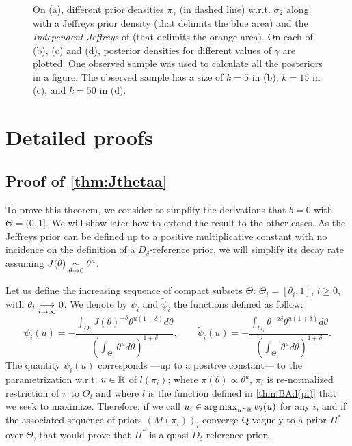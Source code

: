 \begin{figure}[h]
    \caption{On (a), different prior densities $\pi_\gamma$ (in dashed line) w.r.t. $\sigma_2$ along with a Jeffreys prior density (that delimits the blue area) and the \emph{Independent Jeffreys} of \cite{rubio_inference_2014} (that delimits the orange area). On each of (b), (c) and (d), posterior densities for different values of $\gamma$ are plotted. %
    One observed sample was used to calculate all the posteriors in a figure.
    The observed sample has a size of $k=5$ in (b), $k=15$ in (c), and $k=50$ in (d).\label{fig:priorpost}}
\end{figure}








\section{Detailed proofs}\label{sec:BA:proofs}


\subsection{Proof of \cref{thm:Jthetaa}}

To prove this theorem, we consider to simplify the derivations that $b=0$ with $\Theta=(0,1]$. We will show later how to extend the result to the other cases. As the Jeffreys prior can be defined up to a positive multiplicative constant with no incidence on the definition of a $D_\delta$-reference prior, 
we will simplify its decay rate assuming $J(\theta)\underset{\theta\rightarrow 0}{\sim}\theta^a$.

Let us define the increasing sequence of compact subsets $\Theta$: $\Theta_i=[\theta_i,1]$, $i\geq0$, with $\theta_i\overset{\ }{\underset{i\rightarrow\infty}{\longrightarrow}}0$. We denote by $\psi_i$ and $\tilde\psi_i$ the functions defined as follow:
    \begin{equation}
        \psi_i(u) = -\frac{\int_{\Theta_i}J(\theta)^{-\delta}\theta^{u(1+\delta)}d\theta }{\left(\int_{\Theta_i}\theta^ud\theta \right)^{1+\delta}},\qquad \tilde\psi_i(u) = -\frac{\int_{\Theta_i}\theta^{-a\delta }\theta^{u(1+\delta)}d\theta }{\left(\int_{\Theta_i}\theta^ud\theta \right)^{1+\delta}}.
    \end{equation}
The quantity $\psi_i(u)$ corresponds ---up to a positive constant--- to the parametrization w.r.t. $u\in\mathbb{R}$ of $l(\pi_i)$; where $\pi(\theta)\propto\theta^u$, $\pi_i$ is re-normalized restriction of $\pi$ to $\Theta_i$  and where $l$ is the function defined in \cref{thm:BA:l(pi)} that we seek to maximize.
Therefore, if we call $u_i\in\operatorname*{arg\,max}_{u\in\mathbb{R}}\psi_i(u)$ for any $i$, and if the associated sequence of priors $(M(\pi_i))_i$ converge Q-vaguely to a prior $\varPi^\ast$ over $\Theta$, that would prove that $\varPi^\ast$ is a quasi $D_\delta$-reference prior.

